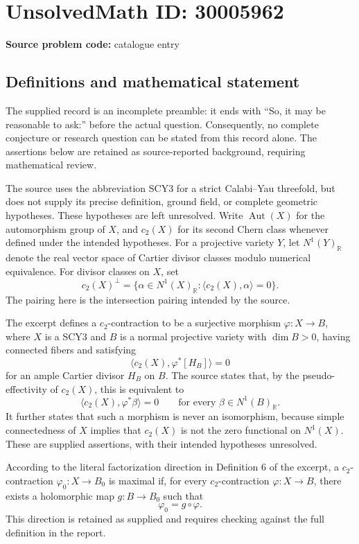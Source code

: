 \documentclass[11pt]{article}
\newcommand{\R}{\mathbb{R}}
\begin{document}
\section*{UnsolvedMath ID: 30005962}
\textbf{Source problem code:} catalogue entry
\subsection{Definitions and mathematical statement}
The supplied record is an incomplete preamble: it ends with ``So, it may be reasonable to ask:'' before the actual question. Consequently, no complete conjecture or research question can be stated from this record alone. The assertions below are retained as source-reported background, requiring mathematical review.

The source uses the abbreviation SCY3 for a strict Calabi--Yau threefold, but does not supply its precise definition, ground field, or complete geometric hypotheses. These hypotheses are left unresolved. Write \(\operatorname{Aut}(X)\) for the automorphism group of \(X\), and \(c_2(X)\) for its second Chern class whenever defined under the intended hypotheses. For a projective variety \(Y\), let \(N^1(Y)_{\R}\) denote the real vector space of Cartier divisor classes modulo numerical equivalence. For divisor classes on \(X\), set
\[
c_2(X)^{\perp}=\{\alpha\in N^1(X)_{\R}:\langle c_2(X),\alpha\rangle=0\}.
\]
The pairing here is the intersection pairing intended by the source.

The excerpt defines a \(c_2\)-contraction to be a surjective morphism \(\varphi:X\to B\), where \(X\) is a SCY3 and \(B\) is a normal projective variety with \(\dim B>0\), having connected fibers and satisfying
\[
\langle c_2(X),\varphi^*[H_B]\rangle=0
\]
for an ample Cartier divisor \(H_B\) on \(B\). The source states that, by the pseudo-effectivity of \(c_2(X)\), this is equivalent to
\[
\langle c_2(X),\varphi^*\beta\rangle=0
\qquad\text{for every }\beta\in N^1(B)_{\R}.
\]
It further states that such a morphism is never an isomorphism, because simple connectedness of \(X\) implies that \(c_2(X)\) is not the zero functional on \(N^1(X)\). These are supplied assertions, with their intended hypotheses unresolved.

According to the literal factorization direction in Definition 6 of the excerpt, a \(c_2\)-contraction \(\varphi_0:X\to B_0\) is maximal if, for every \(c_2\)-contraction \(\varphi:X\to B\), there exists a holomorphic map \(g:B\to B_0\) such that
\[
\varphi_0=g\circ\varphi.
\]
This direction is retained as supplied and requires checking against the full definition in the report.
\end{document}
